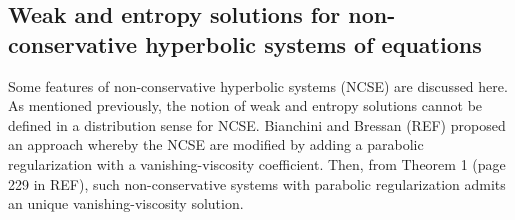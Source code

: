 \documentclass[times,doublespace]{fldauth}%
\begin{document}

\subsection{Weak and entropy solutions for non-conservative hyperbolic systems of equations}
\label{sec:NCSE-theorems}
%
Some features of non-conservative hyperbolic systems (NCSE) are discussed here. As mentioned previously, 
the notion of weak and entropy solutions cannot be defined in a distribution sense for NCSE. 
Bianchini and Bressan (REF) proposed an approach whereby the NCSE are modified by adding a parabolic regularization 
with a vanishing-viscosity coefficient. Then, from Theorem 1 (page 229 in REF), such non-conservative systems with 
parabolic regularization admits an unique vanishing-viscosity solution.
%
\end{document}
